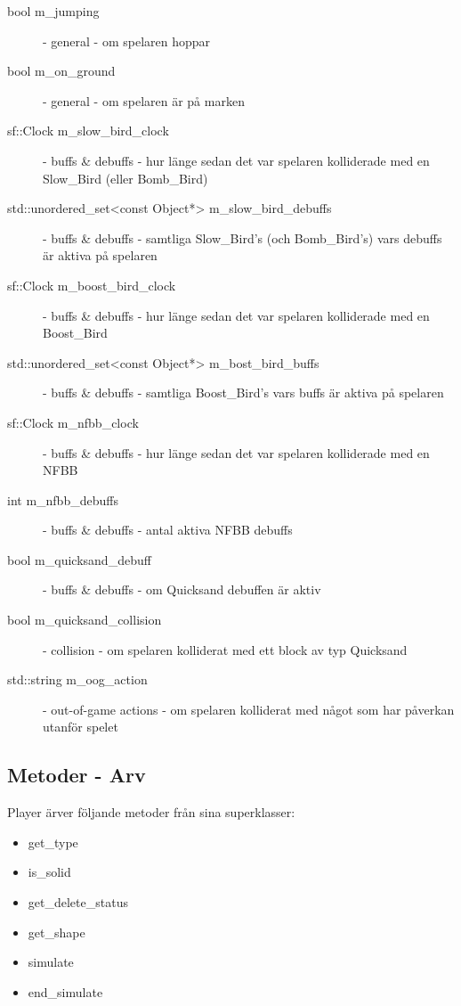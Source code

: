 \documentclass{TDP003mall}
\begin{document}
\begin{description}
\item[bool m\_jumping] - general - om spelaren hoppar
\item[bool m\_on\_ground] - general - om spelaren är på marken
\item[sf::Clock m\_slow\_bird\_clock] - buffs \& debuffs - hur länge sedan det var spelaren kolliderade med en Slow\_Bird (eller Bomb\_Bird)

\item[std::unordered\_set<const Object*> m\_slow\_bird\_debuffs] - buffs \& debuffs - samtliga Slow\_Bird's (och Bomb\_Bird's) vars debuffs är aktiva på spelaren

\item[sf::Clock m\_boost\_bird\_clock] - buffs \& debuffs - hur länge sedan det var spelaren kolliderade med en Boost\_Bird

\item[std::unordered\_set<const Object*> m\_bost\_bird\_buffs] - buffs \& debuffs - samtliga Boost\_Bird's vars buffs är aktiva på spelaren

\item[sf::Clock m\_nfbb\_clock] - buffs \& debuffs - hur länge sedan det var spelaren kolliderade med en NFBB

\item[int m\_nfbb\_debuffs] - buffs \& debuffs - antal aktiva NFBB debuffs

\item[bool m\_quicksand\_debuff] - buffs \& debuffs - om Quicksand debuffen är aktiv

\item[bool m\_quicksand\_collision] - collision - om spelaren kolliderat med ett block av typ Quicksand

\item[std::string m\_oog\_action] - out-of-game actions - om spelaren kolliderat med något som har påverkan utanför spelet
\end{description}

\subsection{Metoder - Arv}
Player ärver följande metoder från sina superklasser:
\begin{itemize}
\item get\_type
\item is\_solid
\item get\_delete\_status
\item get\_shape
\item simulate
\item end\_simulate
\end{itemize}
\end{document}
